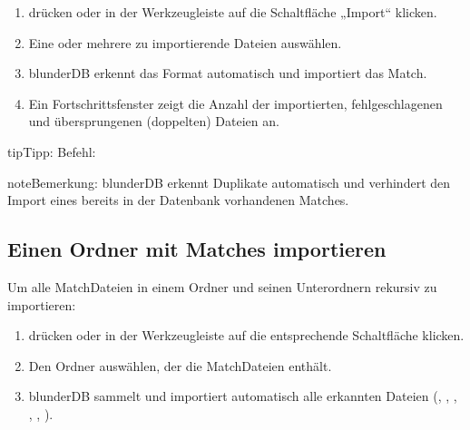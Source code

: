 \documentclass[letterpaper,10pt,german]{sphinxmanual}
\begin{document}
\sphinxAtStartPar
{}
\begin{enumerate}
%
\item {} 
\sphinxAtStartPar
{} drücken oder in der Werkzeugleiste auf die Schaltfläche „Import“ klicken.

\item {} 
\sphinxAtStartPar
Eine oder mehrere zu importierende Dateien auswählen.

\item {} 
\sphinxAtStartPar
blunderDB erkennt das Format automatisch und importiert das Match.

\item {} 
\sphinxAtStartPar
Ein Fortschrittsfenster zeigt die Anzahl der importierten, fehlgeschlagenen und übersprungenen (doppelten) Dateien an.

\end{enumerate}

\begin{sphinxadmonition}{tip}{Tipp:}
\sphinxAtStartPar
Befehl: 
\end{sphinxadmonition}

\begin{sphinxadmonition}{note}{Bemerkung:}
\sphinxAtStartPar
blunderDB erkennt Duplikate automatisch und verhindert den Import eines bereits in der Datenbank vorhandenen Matches.
\end{sphinxadmonition}


\subsection{Einen Ordner mit Matches importieren}
\label{\detokenize{guide_utilisateur:importer-un-dossier-de-matchs}}
\sphinxAtStartPar
Um alle Match\sphinxhyphen{}Dateien in einem Ordner und seinen Unterordnern rekursiv zu importieren:
\begin{enumerate}
%
\item {} 
\sphinxAtStartPar
{} drücken oder in der Werkzeugleiste auf die entsprechende Schaltfläche klicken.

\item {} 
\sphinxAtStartPar
Den Ordner auswählen, der die Match\sphinxhyphen{}Dateien enthält.

\item {} 
\sphinxAtStartPar
blunderDB sammelt und importiert automatisch alle erkannten Dateien (, , , , , ).

\end{enumerate}
\end{document}
